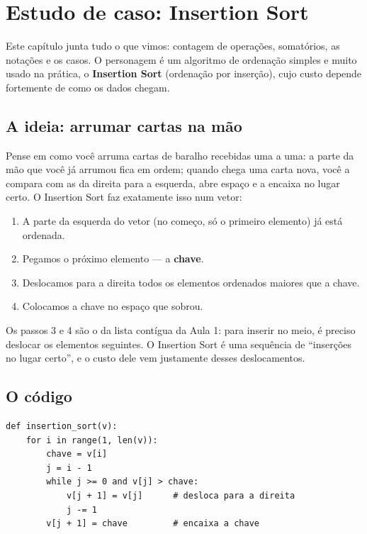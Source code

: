 \chapter{Estudo de caso: Insertion Sort}\label{cap:09}

Este capítulo junta tudo o que vimos: contagem de operações, somatórios, as notações e os casos.
O personagem é um algoritmo de ordenação simples e muito usado na prática, o \textbf{Insertion
Sort} (ordenação por inserção), cujo custo depende fortemente de como os dados chegam.

\section{A ideia: arrumar cartas na mão}

Pense em como você arruma cartas de baralho recebidas uma a uma: a parte da mão que você já
arrumou fica em ordem; quando chega uma carta nova, você a compara com as da direita para a
esquerda, abre espaço e a encaixa no lugar certo. O Insertion Sort faz exatamente isso num vetor:

\begin{enumerate}
  \item A parte da esquerda do vetor (no começo, só o primeiro elemento) já está ordenada.
  \item Pegamos o próximo elemento — a \textbf{chave}.
  \item Deslocamos para a direita todos os elementos ordenados maiores que a chave.
  \item Colocamos a chave no espaço que sobrou.
\end{enumerate}

\begin{conexao}
Os passos 3 e 4 são o  da lista contígua da Aula 1: para inserir no
meio, é preciso deslocar os elementos seguintes. O Insertion Sort é uma sequência de
\enquote{inserções no lugar certo}, e o custo dele vem justamente desses deslocamentos.
\end{conexao}

\section{O código}

\begin{lstlisting}
def insertion_sort(v):
    for i in range(1, len(v)):
        chave = v[i]
        j = i - 1
        while j >= 0 and v[j] > chave:
            v[j + 1] = v[j]      # desloca para a direita
            j -= 1
        v[j + 1] = chave         # encaixa a chave
\end{lstlisting}

